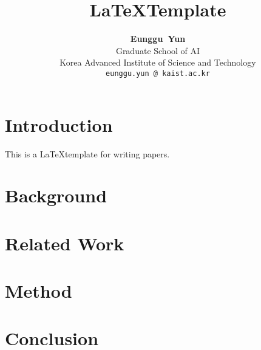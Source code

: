 \documentclass{article}
\title{\LaTeX\space Template}
\author{
    \textbf{Eunggu~Yun}\\
    Graduate School of AI\\
    Korea Advanced Institute of Science and Technology\\[0.5ex]
    \texttt{eunggu.yun\,@\,kaist.ac.kr}
}
\begin{document}
\maketitle

\section{Introduction}
This is a \LaTeX\space template for writing papers.
\lipsum[1-3]

\section{Background}
\lipsum[4-8]

\section{Related Work}
\lipsum[9-13]

\section{Method}
\lipsum[15-21]

\section{Conclusion}
\lipsum[22-24]

\nocite{rolnick2018the}

\clearpage
\newpage

\end{document}
